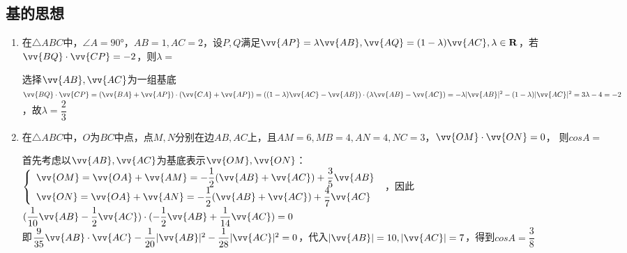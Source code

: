 \subsection*{基的思想}
\begin{enumerate}
    \item 在$\triangle ABC$中，$\angle A = \ang{90}$，$AB = 1, AC = 2$，设$P, Q$满足$\vv{AP} = \lambda \vv{AB}, \vv{AQ} = (1-\lambda)\vv{AC}, \lambda \in \mathbf{R}$，若$\vv{BQ} \cdot \vv{CP} = -2$，则$\lambda = $ 
    \begin{jieda}
        选择$\vv{AB}, \vv{AC}$为一组基底 \\
        $\vv{BQ} \cdot \vv{CP} = (\vv{BA} + \vv{AP}) \cdot (\vv{CA} + \vv{AP}) = ((1-\lambda)\vv{AC} - \vv{AB}) \cdot (\lambda \vv{AB} - \vv{AC}) = -\lambda|\vv{AB}|^2 - (1-\lambda)|\vv{AC}|^2 = 3\lambda - 4 = -2$，故$\lambda = \dfrac{2}{3}$
    \end{jieda}

    \item 在$\triangle ABC$中，$O$为$BC$中点，点$M,N$分别在边$AB, AC$上，且$AM = 6, MB = 4, AN = 4, NC = 3$，$\vv{OM} \cdot \vv{ON} = 0$， 则$cos A = $
    \begin{jieda}
        首先考虑以$\vv{AB}, \vv{AC}$为基底表示$\vv{OM}, \vv{ON}$：\\
        $\left \{ \begin{array}{l}
                \vv{OM} = \vv{OA} + \vv{AM} = -\dfrac{1}{2}(\vv{AB} + \vv{AC}) + \dfrac{3}{5} \vv{AB}  \\
                \vv{ON} = \vv{OA} + \vv{AN} = -\dfrac{1}{2}(\vv{AB} + \vv{AC}) + \dfrac{4}{7} \vv{AC}
        \end{array} \right .$ ，因此$(\dfrac{1}{10}\vv{AB} - \dfrac{1}{2}\vv{AC}) \cdot (-\dfrac{1}{2}\vv{AB} + \dfrac{1}{14}\vv{AC}) = 0$ \\
        即$\dfrac{9}{35} \vv{AB} \cdot \vv{AC} - \dfrac{1}{20}|\vv{AB}|^2 - \dfrac{1}{28}|\vv{AC}|^2 = 0$，代入$|\vv{AB}| = 10, |\vv{AC}| = 7$，得到$cos A = \dfrac{3}{8}$
    \end{jieda}

\end{enumerate}

